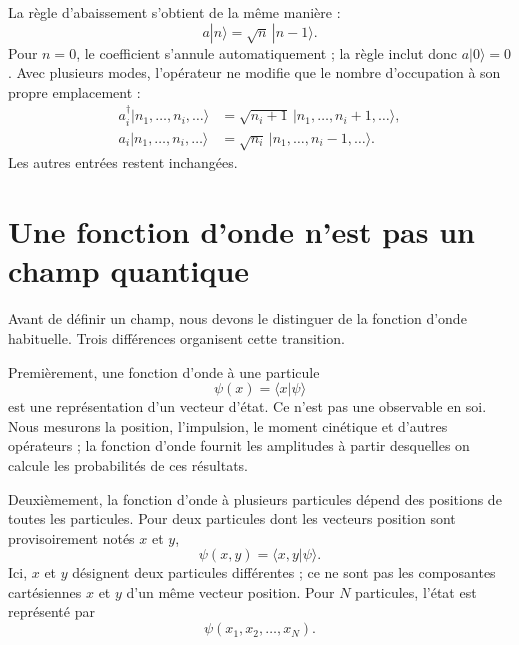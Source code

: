 \begin{classroomqa}\end{classroomqa}

La règle d’abaissement s’obtient de la même manière :
\begin{equation}
a|n\rangle=\sqrt n\,|n-1\rangle.
\label{eq:l06-lowering-rule}
\end{equation}
Pour \(n=0\), le coefficient s’annule automatiquement ; la règle inclut donc \(a|0\rangle=0\). Avec plusieurs modes, l’opérateur ne modifie que le nombre d’occupation à son propre emplacement :
\begin{align}
a_i^\dagger|n_1,\ldots,n_i,\ldots\rangle
&=\sqrt{n_i+1}\,|n_1,\ldots,n_i+1,\ldots\rangle, \\
a_i|n_1,\ldots,n_i,\ldots\rangle
&=\sqrt{n_i}\,|n_1,\ldots,n_i-1,\ldots\rangle.
\label{eq:l06-multimode-ladders}
\end{align}
Les autres entrées restent inchangées.

\section{Une fonction d’onde n’est pas un champ quantique}

Avant de définir un champ, nous devons le distinguer de la fonction d’onde habituelle. Trois différences organisent cette transition.

Premièrement, une fonction d’onde à une particule
\begin{equation}
\psi(x)=\langle x|\psi\rangle
\end{equation}
est une représentation d’un vecteur d’état. Ce n’est pas une observable en soi. Nous mesurons la position, l’impulsion, le moment cinétique et d’autres opérateurs ; la fonction d’onde fournit les amplitudes à partir desquelles on calcule les probabilités de ces résultats.

Deuxièmement, la fonction d’onde à plusieurs particules dépend des positions de toutes les particules. Pour deux particules dont les vecteurs position sont provisoirement notés \(x\) et \(y\),
\begin{equation}
\psi(x,y)=\langle x,y|\psi\rangle.
\end{equation}
Ici, \(x\) et \(y\) désignent deux particules différentes ; ce ne sont pas les composantes cartésiennes \(x\) et \(y\) d’un même vecteur position. Pour \(N\) particules, l’état est représenté par
\begin{equation}
\psi(x_1,x_2,\ldots,x_N).
\end{equation}

